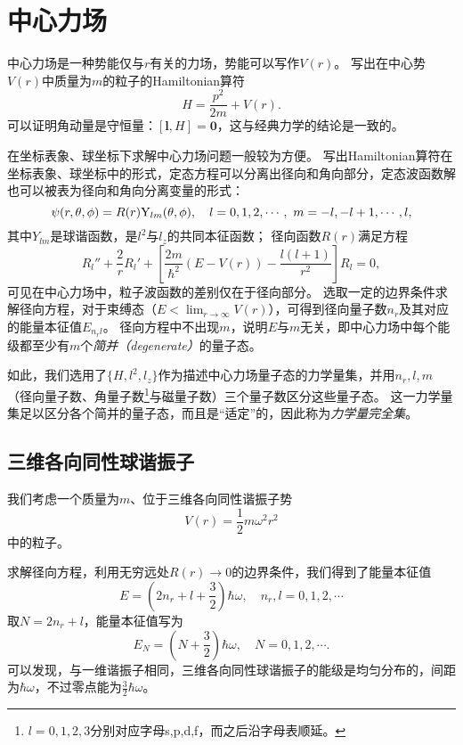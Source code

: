 
\section{中心力场}
\label{sec:central_field}

中心力场是一种势能仅与$r$有关的力场，势能可以写作$V(r)$。
写出在中心势$V(r)$中质量为$m$的粒子的Hamiltonian算符
\begin{equation}
    H = \frac{p^2}{2m} + V(r).
\end{equation}
可以证明角动量是守恒量：$[\bm{l},H]=\bm{0}$，这与经典力学的结论是一致的。

在坐标表象、球坐标下求解中心力场问题一般较为方便。
写出Hamiltonian算符在坐标表象、球坐标中的形式，定态\schrodinger 方程可以分离出径向和角向部分，定态波函数解也可以被表为径向和角向分离变量的形式：
\begin{equation}
    \psi(r,\theta,\phi) = R(r) \rm{Y}_{lm}(\theta,\phi),\quad l=0,1,2,\cdots,\ m=-l,-l+1,\cdots,l,
\end{equation}
其中$Y_{lm}$是球谐函数，是$l^2$与$l_z$的共同本征函数；
径向函数$R(r)$满足方程
\begin{equation}
    R_l'' + \frac{2}{r} R_l' + \left[\frac{2m}{\hbar^2}(E-V(r))-\frac{l(l+1)}{r^2}\right] R_l = 0,
\end{equation}
可见在中心力场中，粒子波函数的差别仅在于径向部分。
选取一定的边界条件求解径向方程，对于束缚态（$E<\lim_{r\rightarrow\infty} V(r)$），可得到径向量子数$n_r$及其对应的能量本征值$E_{n_r l}$。
径向方程中不出现$m$，说明$E$与$m$无关，即中心力场中每个能级都至少有$m$个\emph{简并（degenerate）}的量子态。

如此，我们选用了$\{H, l^2, l_z\}$作为描述中心力场量子态的力学量集，并用$n_r, l, m$（径向量子数、角量子数\footnote{$l=0,1,2,3$分别对应字母s,p,d,f，而之后沿字母表顺延。}与磁量子数）三个量子数区分这些量子态。
这一力学量集足以区分各个简并的量子态，而且是“适定”的，因此称为\emph{力学量完全集}。

\subsection{三维各向同性球谐振子}
\label{subsec:cf_osc}

我们考虑一个质量为$m$、位于三维各向同性谐振子势
\begin{equation}
    V(r) = \frac12 m\omega^2 r^2
\end{equation}
中的粒子。

求解径向方程，利用无穷远处$R(r)\rightarrow 0$的边界条件，我们得到了能量本征值
\begin{equation}
    E = \left( 2n_r+l+\frac32 \right)\hbar\omega,\quad n_r,l=0,1,2,\cdots
\end{equation}
取$N=2n_r+l$，能量本征值写为
\begin{equation}
    E_N = (N+\frac32) \hbar\omega,\quad N=0,1,2,\cdots.
\end{equation}
可以发现，与一维谐振子相同，三维各向同性球谐振子的能级是均匀分布的，间距为$\hbar\omega$，不过零点能为$\frac32\hbar\omega$。

